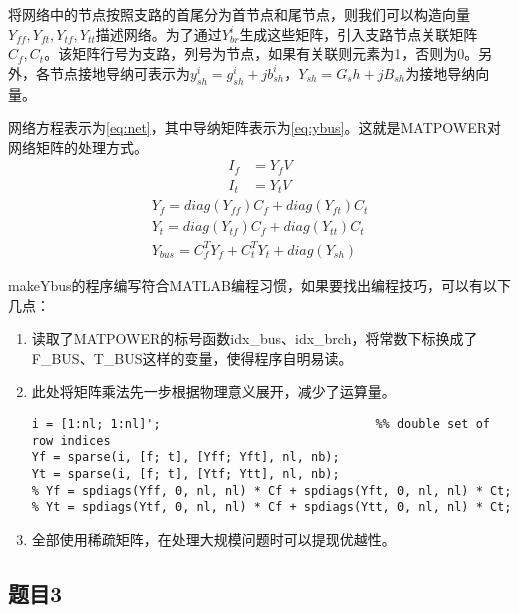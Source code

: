 \documentclass[a4paper,12pt]{article}
\begin{document}
    将网络中的节点按照支路的首尾分为首节点和尾节点，则我们可以构造向量$Y_{ff},Y_{ft},Y_{tf},Y_{tt}$描述网络。为了通过$Y_{br}^i$生成这些矩阵，引入支路节点关联矩阵$C_f, C_t$。该矩阵行号为支路，列号为节点，如果有关联则元素为1，否则为0。另外，各节点接地导纳可表示为$y_{sh}^i=g_{sh}^i+j b_{sh}^i$，$Y_{sh}=G_sh+jB_{sh}$为接地导纳向量。

    网络方程表示为\cref{eq:net}，其中导纳矩阵表示为\cref{eq:ybus}。这就是MATPOWER对网络矩阵的处理方式。
    \begin{equation}
      \label{eq:net}
      \begin{aligned}
        I_f &= Y_f V \\
        I_t &= Y_t V
      \end{aligned}
    \end{equation}
    \begin{equation}
      \label{eq:ybus}
      \begin{aligned}
          Y_f = diag(Y_{ff})C_f+diag(Y_{ft})C_t\\
          Y_t = diag(Y_{tf})C_f+diag(Y_{tt})C_t\\
          Y_{bus} = C_f^TY_f+C_t^TY_t+diag(Y_{sh})
      \end{aligned}
    \end{equation}

    makeYbus的程序编写符合MATLAB编程习惯，如果要找出编程技巧，可以有以下几点：
    \begin{enumerate}
      \item 读取了MATPOWER的标号函数idx\_bus、idx\_brch，将常数下标换成了F\_BUS、T\_BUS这样的变量，使得程序自明易读。
      \item 此处将矩阵乘法先一步根据物理意义展开，减少了运算量。
      \begin{lstlisting}[style=Matlab-editor,basicstyle=\mlttfamily]
%% at each branch's "from" bus, and Yt is the same for the "to" bus end
i = [1:nl; 1:nl]';                              %% double set of row indices
Yf = sparse(i, [f; t], [Yff; Yft], nl, nb);
Yt = sparse(i, [f; t], [Ytf; Ytt], nl, nb);
% Yf = spdiags(Yff, 0, nl, nl) * Cf + spdiags(Yft, 0, nl, nl) * Ct;
% Yt = spdiags(Ytf, 0, nl, nl) * Cf + spdiags(Ytt, 0, nl, nl) * Ct;
      \end{lstlisting}
      \item 全部使用稀疏矩阵，在处理大规模问题时可以提现优越性。
    \end{enumerate}
    \subsection{题目3}
\end{document}
